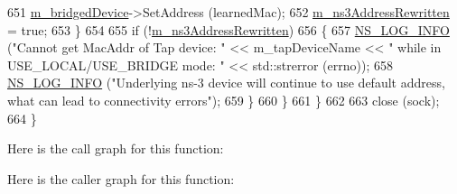 \begin{DoxyCode}
651               \hyperlink{classns3_1_1TapBridge_ac4ba97368116b628d632d318d5562420}{m\_bridgedDevice}->SetAddress (learnedMac);
652               \hyperlink{classns3_1_1TapBridge_a3200dc6b4b46d2f0fb13c867fcb0d118}{m\_ns3AddressRewritten} = \textcolor{keyword}{true};
653             \}
654 
655           \textcolor{keywordflow}{if} (!\hyperlink{classns3_1_1TapBridge_a3200dc6b4b46d2f0fb13c867fcb0d118}{m\_ns3AddressRewritten})
656             \{
657               \hyperlink{group__logging_gafbd73ee2cf9f26b319f49086d8e860fb}{NS\_LOG\_INFO} (\textcolor{stringliteral}{"Cannot get MacAddr of Tap device: "} << m\_tapDeviceName << \textcolor{stringliteral}{" while in
       USE\_LOCAL/USE\_BRIDGE mode: "} << std::strerror (errno));
658               \hyperlink{group__logging_gafbd73ee2cf9f26b319f49086d8e860fb}{NS\_LOG\_INFO} (\textcolor{stringliteral}{"Underlying ns-3 device will continue to use default address, what
       can lead to connectivity errors"});
659             \}
660         \}
661     \}
662 
663   close (sock);
664 \}
\end{DoxyCode}


Here is the call graph for this function\+:




Here is the caller graph for this function\+:


